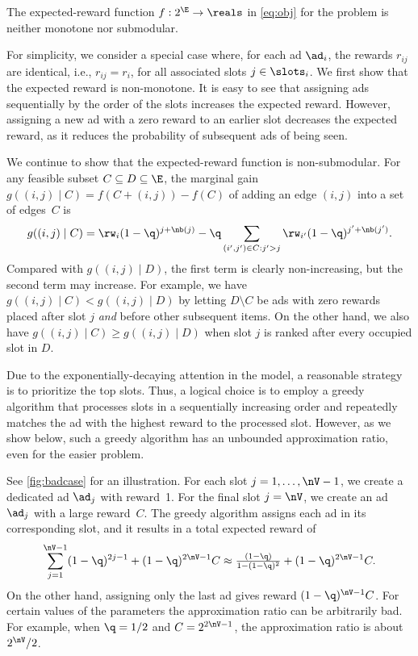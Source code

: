 \begin{propositionE}\label{prop:nonsubm}
	The expected-reward function $f: 2^\E \to \reals$ in \cref{eq:obj} for the \streamads problem is 
	neither monotone nor submodular.
\end{propositionE}
\begin{proofE}
	For simplicity, we consider a special case where,
	for each ad $\ad_i$, the rewards $r_{ij}$ are identical, i.e., $r_{ij} = r_i$, 
	for all associated slots $j \in \slots_i$.
	We first show that the expected reward is non-monotone. 
	It is easy to see that assigning ads sequentially by the order of the slots increases the expected reward.
	However, assigning a new ad with a zero reward to an earlier slot decreases the expected reward, as it reduces the probability of subsequent ads of being seen.
	
	We continue to show that the expected-reward function is non-submodular. 
	For any feasible subset $C \subseteq D \subseteq \E$, 
	the marginal gain $g((i,j) \mid C) = f(C+(i,j)) - f(C)$ 
	of adding an edge $(i, j)$ into a set of edges~$C$ is
	\begin{align*}
		g((i, j) \mid C) 
		= \rw_i (1-\q)^{j + \nb(j)} - \q \sum_{(i',j') \in C: j' > j} \rw_{i'} (1-\q)^{j' + \nb(j')}.
	\end{align*}
	Compared with $g((i ,j) \mid D)$, 
	the first term is clearly non-increasing,
	but the second term may increase.
	For example, we have $g((i ,j) \mid C) < g((i ,j) \mid D)$ 
	by letting $D \setminus C$ be ads with zero rewards placed after slot $j$ \emph{and} before other subsequent items.
	On the other hand, 
	we also have $g((i ,j) \mid C) \ge g((i ,j) \mid D)$ 
	when slot $j$ is ranked after every occupied slot in $D$.
\end{proofE}


Due to the exponentially-decaying attention in the model, 
a reasonable strategy is to prioritize the top slots.
Thus, a logical choice is to employ a greedy algorithm that processes slots in a sequentially increasing order 
and repeatedly matches the ad with the highest reward to the processed slot.
However, as we show below, 
such a greedy algorithm has an unbounded approximation ratio, even for the easier \streamadsr problem.


\begin{example}\label{exmaple:top}
	See \cref{fig:badcase} for an illustration.
	For each slot $j = 1, \ldots, \nV-1$, we create a dedicated ad $\ad_j$ with reward~1.
	For the final slot $j=\nV$, we create an ad $\ad_j$ with a large reward~$C$.
	The greedy algorithm assigns each ad in its corresponding slot, and it results 
	in a total expected reward of 
	\begin{equation*}
		\sum_{j=1}^{\nV-1} (1-\q)^{2j-1} +  (1-\q)^{2\nV-1} C
		 \approx \tfrac{(1-\q)}{1-(1-\q)^2} + (1-\q)^{2\nV-1} C.
	\end{equation*}
	On the other hand, assigning only the last ad gives reward $(1-\q)^{\nV-1} C$.
	For certain values of the parameters 
	the approximation ratio can be arbitrarily bad.
	For example, when $\q=1/2$ and $C=2^{2\nV-1}$,
	the approximation ratio is about $2^\nV / 2$. 
\end{example}

